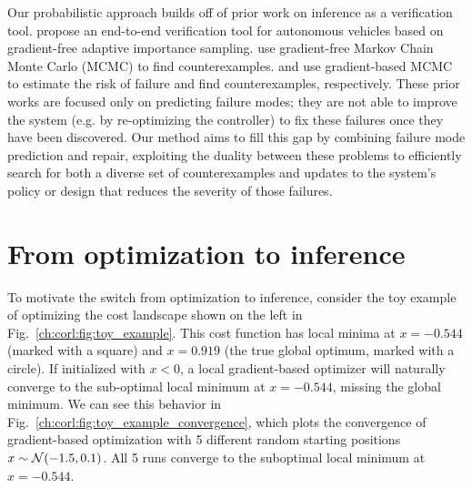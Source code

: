 Our probabilistic approach builds off of prior work on inference as a verification tool. \cite{okellyScalableEndtoEndAutonomous2018} propose an end-to-end verification tool for autonomous vehicles based on gradient-free adaptive importance sampling. \cite{zhouRoCUSRobotController2021} use gradient-free Markov Chain Monte Carlo (MCMC) to find counterexamples. \cite{sinhaNeuralBridgeSampling2020} and \cite{deleckiModelbasedValidationProbabilistic2023a} use gradient-based MCMC to estimate the risk of failure and find counterexamples, respectively.
%
These prior works are focused only on predicting failure modes; they are not able to improve the system (e.g. by re-optimizing the controller) to fix these failures once they have been discovered. Our method aims to fill this gap by combining failure mode prediction and repair, exploiting the duality between these problems to efficiently search for both a diverse set of counterexamples and updates to the system's policy or design that reduces the severity of those failures.

\section{From optimization to inference}

To motivate the switch from optimization to inference, consider the toy example of optimizing the cost landscape shown on the left in Fig.~\ref{ch:corl:fig:toy_example}. This cost function has local minima at $x = -0.544$ (marked with a square) and $x = 0.919$ (the true global optimum, marked with a circle). If initialized with $x < 0$, a local gradient-based optimizer will naturally converge to the sub-optimal local minimum at $x = -0.544$, missing the global minimum. We can see this behavior in Fig.~\ref{ch:corl:fig:toy_example_convergence}, which plots the convergence of gradient-based optimization with 5 different random starting positions $x\sim\mathcal{N}(-1.5, 0.1)$. All 5 runs converge to the suboptimal local minimum at $x = -0.544$.


